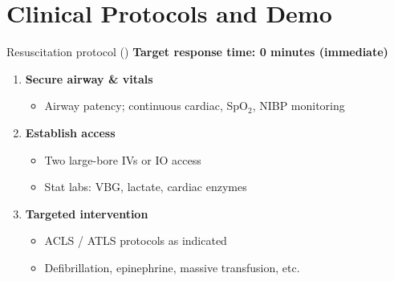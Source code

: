 \section{Clinical Protocols and Demo}

\begin{frame}{Resuscitation protocol ()}
  \textbf{Target response time: 0 minutes (immediate)}

  \begin{enumerate}
    \item \textbf{Secure airway \& vitals}
    \begin{itemize}
      \item Airway patency; continuous cardiac, SpO$_2$, NIBP monitoring
    \end{itemize}
    \item \textbf{Establish access}
    \begin{itemize}
      \item Two large-bore IVs or IO access
      \item Stat labs: VBG, lactate, cardiac enzymes
    \end{itemize}
    \item \textbf{Targeted intervention}
    \begin{itemize}
      \item ACLS / ATLS protocols as indicated
      \item Defibrillation, epinephrine, massive transfusion, etc.
    \end{itemize}
  \end{enumerate}

\end{frame}

